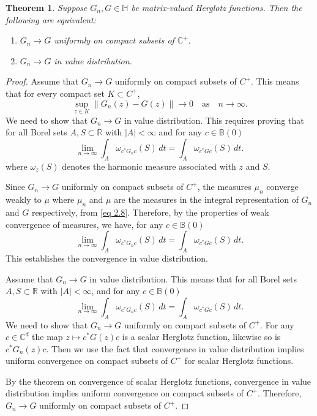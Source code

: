 \documentclass[reqno]{amsart}
\numberwithin{equation}{section}
\newcommand{\C}{\mathbb{C}}
\newtheorem{theorem}{Theorem}[section]
\begin{document}
\begin{theorem}\label{thm 4.6}  Suppose $ G_n, G \in \mathbb H$ be matrix-valued Herglotz functions. Then the following are equivalent: 
	\begin{enumerate}   \item $G_n \rightarrow G$ uniformly on compact subsets of $\C^+.$
 \item $G_n \rightarrow G$ in value distribution.\end{enumerate}\end{theorem}


\begin{proof} Assume that \( G_n \to G \) uniformly on compact subsets of \( C^+ \). This means that for every compact set \( K \subset C^+ \),
\[
\sup_{z \in K} \| G_n(z) - G(z) \| \to 0 \quad \text{as} \quad n \to \infty.
\]
We need to show that \( G_n \to G \) in value distribution. This requires proving that for all Borel sets \( A, S \subset \mathbb{R} \) with \( |A| < \infty \) and for any $c\in \mathbb{B} (0)$
\[
\lim_{n \to \infty} \int_A \omega_{c^*G_n c}(S) \, dt = \int_A \omega_{c^*G c }(S) \, dt. \]
where \( \omega_{z}(S) \) denotes the harmonic measure associated with \( z \) and \( S \).

Since \( G_n \to G \) uniformly on compact subsets of \( C^+ \), the measures \( \mu_n \)  converge weakly to \( \mu \) where \( \mu_n \) and  \( \mu \) are the measures in the integral representation of \( G_n \) and \( G \) respectively,  from \eqref{eq 2.8}. Therefore, by the properties of weak convergence of measures, we have, for any $c\in \mathbb{B} (0)$
\[
\lim_{n \to \infty} \int_A \omega_{c^*G_n c}(S) \, dt = \int_A \omega_{c^*G c }(S) \, dt. \]
This establishes the convergence in value distribution.

Assume that \( G_n \to G \) in value distribution. This means that for all Borel sets \( A, S \subset \mathbb{R} \) with \( |A| < \infty \), and for any $c\in \mathbb{B} (0)$
\[
\lim_{n \to \infty} \int_A \omega_{c^*G_n c}(S) \, dt = \int_A \omega_{c^*G c }(S) \, dt. \]
We need to show that \( G_n \to G \) uniformly on compact subsets of \( C^+ \).  For any $c \in \C^d$ the map $z \mapsto c^*G(z)c$ is a scalar Herglotz function, likewise so is $c^*G_n(z)c$. Then we      use the fact that convergence in value distribution implies uniform convergence on compact subsets of \( C^+ \) for   scalar Herglotz functions.

By the theorem on convergence of scalar Herglotz functions, convergence in value distribution implies uniform convergence on compact subsets of \( C^+ \). Therefore, \( G_n \to G \) uniformly on compact subsets of \( C^+ \).
 \end{proof}
\end{document}
